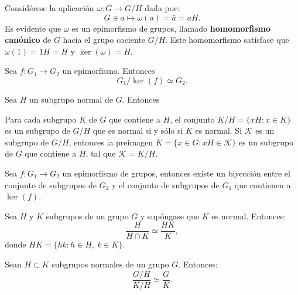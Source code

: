 Considérese la aplicación $\omega \colon G \to G/H$ dada por: \[G \ni a \mapsto \omega(a) = 	\bar{a} = aH. \]
Es evidente que $\omega$ es un epimorfismo de grupos, llamado \textbf{homomorfismo canónico} de $G$ hacia el grupo cociente $G/H$. Este homomorfismo satisface que $\omega(1) = 1H = H$ y $\ker(\omega) = H.$ 
\begin{corolario}
Sea $f \colon G_1 \to G_2$ un epimorfismo. Entonces \[ G_1/\ker(f) \simeq G_2. \]
\end{corolario}
\begin{lema}
Sea $H$ un subgrupo normal de $G$. Entonces
\begin{bulletList}
\newItem Para cada subgrupo $K$ de $G$ que contiene a $H$, el conjunto $K/H = \{ xH \colon x \in K \}$ es un subgrupo de $G/H$ que es normal si y sólo si $K$ es normal.
\newItem Si $\mathcal{K}$ es un subgrupo de $G/H$, entonces la preimagen $K = \{ x \in G \colon xH \in \mathcal{K} \}$ es un subgrupo de $G$ que contiene a $H$, tal que $\mathcal{K} = K/H$.
\end{bulletList}
\end{lema}
\begin{teorema}
Sea $f \colon G_1 \to G_2$ un epimorfismo de grupos, entonces existe un biyección entre el conjunto de subgrupos de $G_2$ y el conjunto de subgrupos de $G_1$ que contienen a $\ker(f)$.
\end{teorema}
\begin{teorema}
Sea $H$ y $K$ subgrupos de un grupo $G$ y supóngase que $K$ es normal. Entonces: \[ \frac{H}{H \cap K} \simeq \frac{HK}{K}, \] donde $HK = \{ hk \colon h \in H, \ k \in K \}$.
\end{teorema}
\begin{teorema}
Sean $H \subset K$ subgrupos normales de un grupo $G$. Entonces:
\[\frac{G/H}{K/H} \simeq \frac{G}{K}. \]
\end{teorema}
